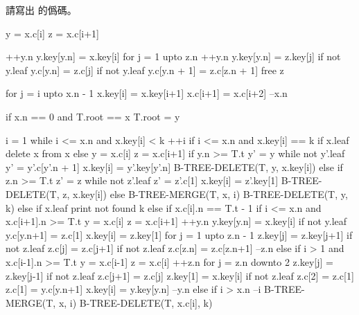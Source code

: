 \startEXERCISE
請寫出  的僞碼。
\stopEXERCISE

\startANSWER
{}
\startCLRSCODE
y = x.c[i]
z = x.c[i+1]

++y.n
y.key[y.n] = x.key[i]
for j = 1 upto z.n
	++y.n
	y.key[y.n] = z.key[j]
	if not y.leaf
		y.c[y.n] = z.c[j]
if not y.leaf
	y.c[y.n + 1] = z.c[z.n + 1]
free z

for j = i upto x.n - 1
	x.key[i] = x.key[i+1]
	x.c[i+1] = x.c[i+2]
--x.n

if x.n == 0 and T.root == x
	T.root = y
\stopCLRSCODE

\startCLRSCODE
i = 1
while i <= x.n and x.key[i] < k
	++i
if i <= x.n and x.key[i] == k
	if x.leaf
		delete x from x
	else
		y = x.c[i]
		z = x.c[i+1]
		if y.n >= T.t
			y' = y
			while not y'.leaf
				y' = y'.c[y'.n + 1]
			x.key[i] = y'.key[y'.n]
			B-TREE-DELETE(T, y, x.key[i])
		else if z.n >= T.t
			z' = z
			while not z'.leaf
				z' = z'.c[1]
			x.key[i] = z'.key[1]
			B-TREE-DELETE(T, z, x.key[i])
		else
			B-TREE-MERGE(T, x, i)
			B-TREE-DELETE(T, y, k)
else
	if x.leaf
		print not found k
	else
		if x.c[i].n == T.t - 1
			if i <= x.n and x.c[i+1].n >= T.t
				y = x.c[i]
				z = x.c[i+1]
				++y.n
				y.key[y.n] = x.key[i]
				if not y.leaf
					y.c[y.n+1] = z.c[1]
				x.key[i] = z.key[1]
				for j = 1 upto z.n - 1
					z.key[j] = z.key[j+1]
					if not z.leaf
						z.c[j] = z.c[j+1]
				if not z.leaf
					z.c[z.n] = z.c[z.n+1]
				--z.n
			else if i > 1 and x.c[i-1].n >= T.t
				y = x.c[i-1]
				z = x.c[i]
				++z.n
				for j = z.n downto 2
					z.key[j] = z.key[j-1]
					if not z.leaf
						z.c[j+1] = z.c[j]
				z.key[1] = x.key[i]
				if not z.leaf
					z.c[2] = z.c[1]
					z.c[1] = y.c[y.n+1]
				x.key[i] = y.key[y.n]
				--y.n
			else
				if i > x.n
					--i
				B-TREE-MERGE(T, x, i)
		B-TREE-DELETE(T, x.c[i], k)
\stopCLRSCODE
\stopANSWER
